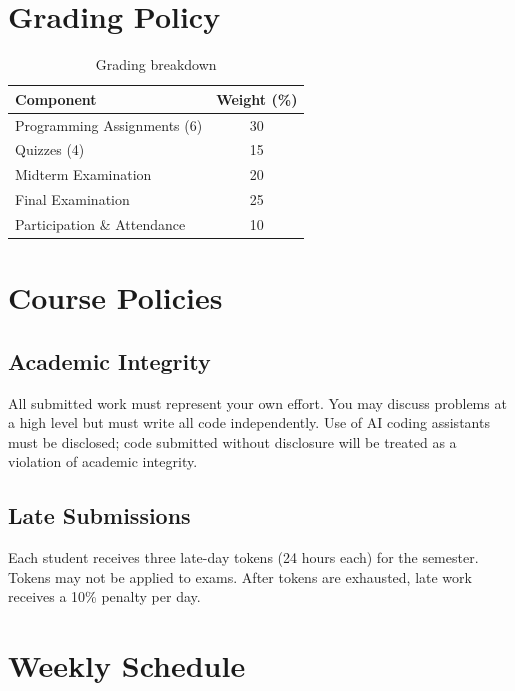 \documentclass[
    language=english,
    doctype=course-material,
    institution=none,
]{../../omnilatex}
\begin{document}
\section{Grading Policy}

\begin{table}[htbp]
    \centering
    \caption{Grading breakdown}
    \begin{tabular}{@{}lc@{}}
        \toprule
        Component & Weight (\%) \\
        \midrule
        Programming Assignments (6) & 30 \\
        Quizzes (4) & 15 \\
        Midterm Examination & 20 \\
        Final Examination & 25 \\
        Participation \& Attendance & 10 \\
        \bottomrule
    \end{tabular}
\end{table}

\section{Course Policies}

\subsection{Academic Integrity}

All submitted work must represent your own effort.  You may discuss problems
at a high level but must write all code independently.  Use of AI coding
assistants must be disclosed; code submitted without disclosure will be
treated as a violation of academic integrity.

\subsection{Late Submissions}

Each student receives three late-day tokens (24 hours each) for the semester.
Tokens may not be applied to exams.  After tokens are exhausted, late work
receives a 10\% penalty per day.

\section{Weekly Schedule}
\end{document}
